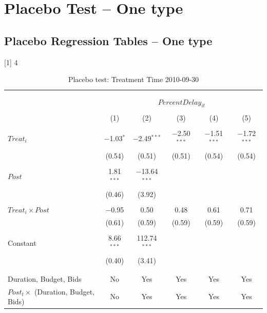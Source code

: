 \documentclass[
]{article}
\begin{document}
\hypertarget{placebo-test-one-type}{%
\section{Placebo Test -- One type}\label{placebo-test-one-type}}

\hypertarget{placebo-regression-tables-one-type}{%
\subsection{Placebo Regression Tables -- One
type}\label{placebo-regression-tables-one-type}}

{[}1{]} 4

\begin{table}[H] \centering 
  \caption{Placebo test: Treatment Time 2010-09-30} 
  \label{} 
\small 
\begin{tabular}{@{\extracolsep{-2pt}}lccccc} 
\\[-1.8ex]\hline 
\hline \\[-1.8ex] 
\\[-1.8ex] & \multicolumn{5}{c}{$PercentDelay_{it}$} \\ 
\\[-1.8ex] & (1) & (2) & (3) & (4) & (5)\\ 
\hline \\[-1.8ex] 
 $Treat_i$ & $-$1.03$^{*}$ & $-$2.49$^{***}$ & $-$2.50$^{***}$ & $-$1.51$^{***}$ & $-$1.72$^{***}$ \\ 
  & (0.54) & (0.51) & (0.51) & (0.54) & (0.54) \\ 
  & & & & & \\ 
 $Post$ & 1.81$^{***}$ & $-$13.64$^{***}$ &  &  &  \\ 
  & (0.46) & (3.92) &  &  &  \\ 
  & & & & & \\ 
 $Treat_i \times Post$ & $-$0.95 & 0.50 & 0.48 & 0.61 & 0.71 \\ 
  & (0.61) & (0.59) & (0.59) & (0.59) & (0.59) \\ 
  & & & & & \\ 
 Constant & 8.66$^{***}$ & 112.74$^{***}$ &  &  &  \\ 
  & (0.40) & (3.41) &  &  &  \\ 
  & & & & & \\ 
\hline \\[-1.8ex] 
Duration, Budget, Bids & No & Yes & Yes & Yes & Yes \\ 
$Post_t \times$  (Duration, Budget, Bids) & No & Yes & Yes & Yes & Yes \\ 

\end{tabular}
\end{table}
\end{document}
